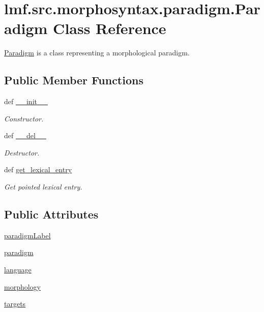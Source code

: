 \hypertarget{classlmf_1_1src_1_1morphosyntax_1_1paradigm_1_1_paradigm}{\section{lmf.\+src.\+morphosyntax.\+paradigm.\+Paradigm Class Reference}
\label{classlmf_1_1src_1_1morphosyntax_1_1paradigm_1_1_paradigm}
}


\hyperlink{classlmf_1_1src_1_1morphosyntax_1_1paradigm_1_1_paradigm}{Paradigm} is a class representing a morphological paradigm.  


\subsection*{Public Member Functions}
\begin{DoxyCompactItemize}
\item 
def \hyperlink{classlmf_1_1src_1_1morphosyntax_1_1paradigm_1_1_paradigm_ab0c529b6dfdc802436aaee80cc7a3f1a}{\+\_\+\+\_\+init\+\_\+\+\_\+}
\begin{DoxyCompactList}\small\item\em Constructor. \end{DoxyCompactList}\item 
def \hyperlink{classlmf_1_1src_1_1morphosyntax_1_1paradigm_1_1_paradigm_a27ffcc1bdb76712e7d8b31de78412f8a}{\+\_\+\+\_\+del\+\_\+\+\_\+}
\begin{DoxyCompactList}\small\item\em Destructor. \end{DoxyCompactList}\item 
def \hyperlink{classlmf_1_1src_1_1morphosyntax_1_1paradigm_1_1_paradigm_aa9cc39604cd3b3d06e1d142016db3541}{get\+\_\+lexical\+\_\+entry}
\begin{DoxyCompactList}\small\item\em Get pointed lexical entry. \end{DoxyCompactList}\end{DoxyCompactItemize}
\subsection*{Public Attributes}
\begin{DoxyCompactItemize}
\item 
\hyperlink{classlmf_1_1src_1_1morphosyntax_1_1paradigm_1_1_paradigm_a5892a515d2311d4c03b180603a0d2929}{paradigm\+Label}
\item 
\hyperlink{classlmf_1_1src_1_1morphosyntax_1_1paradigm_1_1_paradigm_a2c706c0653324f536c9fc8b20d5dbf15}{paradigm}
\item 
\hyperlink{classlmf_1_1src_1_1morphosyntax_1_1paradigm_1_1_paradigm_a536c9155740d0363044389ce31dff090}{language}
\item 
\hyperlink{classlmf_1_1src_1_1morphosyntax_1_1paradigm_1_1_paradigm_a7c9c944b764a0351f0e58234b48bdf86}{morphology}
\item 
\hyperlink{classlmf_1_1src_1_1morphosyntax_1_1paradigm_1_1_paradigm_a546af1d9fc21b3b1a6d102e39877a587}{targets}
\end{DoxyCompactItemize}


